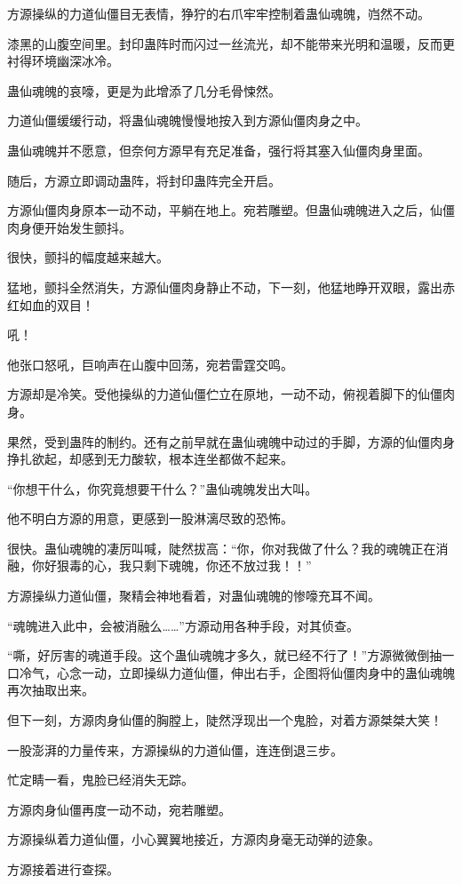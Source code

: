 \begin{this_body}
方源操纵的力道仙僵目无表情，狰狞的右爪牢牢控制着蛊仙魂魄，岿然不动。

漆黑的山腹空间里。封印蛊阵时而闪过一丝流光，却不能带来光明和温暖，反而更衬得环境幽深冰冷。

蛊仙魂魄的哀嚎，更是为此增添了几分毛骨悚然。

力道仙僵缓缓行动，将蛊仙魂魄慢慢地按入到方源仙僵肉身之中。

蛊仙魂魄并不愿意，但奈何方源早有充足准备，强行将其塞入仙僵肉身里面。

随后，方源立即调动蛊阵，将封印蛊阵完全开启。

方源仙僵肉身原本一动不动，平躺在地上。宛若雕塑。但蛊仙魂魄进入之后，仙僵肉身便开始发生颤抖。

很快，颤抖的幅度越来越大。

猛地，颤抖全然消失，方源仙僵肉身静止不动，下一刻，他猛地睁开双眼，露出赤红如血的双目！

吼！

他张口怒吼，巨响声在山腹中回荡，宛若雷霆交鸣。

方源却是冷笑。受他操纵的力道仙僵伫立在原地，一动不动，俯视着脚下的仙僵肉身。

果然，受到蛊阵的制约。还有之前早就在蛊仙魂魄中动过的手脚，方源的仙僵肉身挣扎欲起，却感到无力酸软，根本连坐都做不起来。

“你想干什么，你究竟想要干什么？”蛊仙魂魄发出大叫。

他不明白方源的用意，更感到一股淋漓尽致的恐怖。

很快。蛊仙魂魄的凄厉叫喊，陡然拔高：“你，你对我做了什么？我的魂魄正在消融，你好狠毒的心，我只剩下魂魄，你还不放过我！！”

方源操纵力道仙僵，聚精会神地看着，对蛊仙魂魄的惨嚎充耳不闻。

“魂魄进入此中，会被消融么……”方源动用各种手段，对其侦查。

“嘶，好厉害的魂道手段。这个蛊仙魂魄才多久，就已经不行了！”方源微微倒抽一口冷气，心念一动，立即操纵力道仙僵，伸出右手，企图将仙僵肉身中的蛊仙魂魄再次抽取出来。

但下一刻，方源肉身仙僵的胸膛上，陡然浮现出一个鬼脸，对着方源桀桀大笑！

一股澎湃的力量传来，方源操纵的力道仙僵，连连倒退三步。

忙定睛一看，鬼脸已经消失无踪。

方源肉身仙僵再度一动不动，宛若雕塑。

方源操纵着力道仙僵，小心翼翼地接近，方源肉身毫无动弹的迹象。

方源接着进行查探。


\end{this_body}
